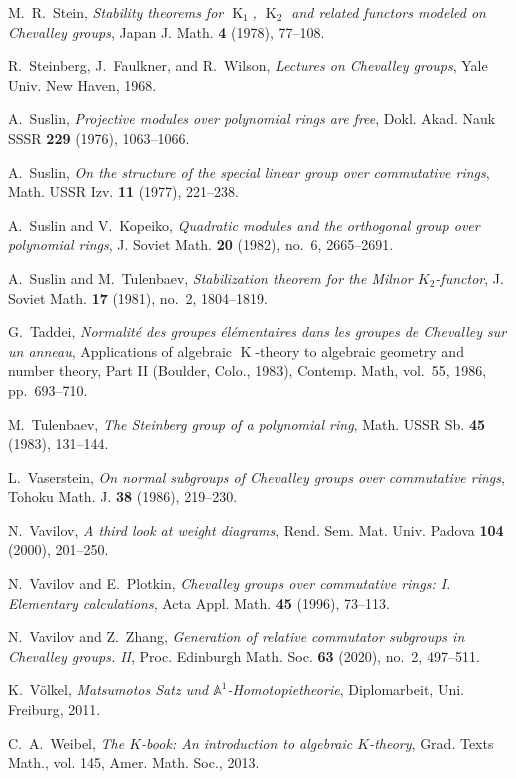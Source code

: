 \documentclass[10pt,a4paper,twoside]{article}
\theoremstyle{remark}
\theoremstyle{definition}
\numberwithin{lemma}{section}
\numberwithin{prop}{section}
\numberwithin{corollary}{section}
\numberwithin{externaltheorem}{section}
\DeclareMathOperator{\K}{K}
\numberwithin{equation}{section}
\begin{document}
\begin{thebibliography}{1000}
 M.~R.~Stein, 
 \emph{Stability theorems for $\K_1$, $\K_2$ and related functors modeled on Chevalley groups},
 Japan J. Math. \textbf{4} (1978), 77--108.

 R.~Steinberg, J.~Faulkner, and R.~Wilson, 
 \emph{Lectures on Chevalley groups},
 Yale Univ. New Haven, 1968.

 A.~Suslin, 
 \emph{Projective modules over polynomial rings are free}, 
 Dokl. Akad. Nauk SSSR \textbf{229} (1976), 1063--1066.

 A.~Suslin, 
 \emph{On the structure of the special linear group over commutative rings},
 Math. USSR Izv. \textbf{11} (1977), 221--238.

 A.~Suslin and V.~Kopeiko, 
 \emph{Quadratic modules and the orthogonal group over polynomial rings},
 J. Soviet Math. \textbf{20} (1982), no.~6, 2665--2691.

 A.~Suslin and M.~Tulenbaev, 
 \emph{Stabilization theorem for the Milnor $K_2$-functor},
 J. Soviet Math. \textbf{17} (1981), no.~2, 1804--1819.

 G.~Taddei, 
 \emph{Normalit\'e des groupes \'el\'ementaires dans les groupes de Chevalley sur un anneau},
 Applications of algebraic $\K$-theory to algebraic geometry and number theory, Part II (Boulder, Colo., 1983),
 Contemp. Math, vol.~55, 1986, pp.~693--710.

 M.~Tulenbaev, 
 \emph{The Steinberg group of a polynomial ring},
 Math. USSR Sb. \textbf{45} (1983), 131--144.

 L.~Vaserstein, 
 \emph{On normal subgroups of Chevalley groups over commutative rings},
 Tohoku Math. J. \textbf{38} (1986), 219--230.

 N.~Vavilov, 
 \emph{A third look at weight diagrams}, 
 Rend. Sem. Mat. Univ. Padova \textbf{104} (2000), 201--250.

 N.~Vavilov and E.~Plotkin, 
 \emph{Chevalley groups over commutative rings: I. Elementary calculations},
 Acta Appl. Math. \textbf{45} (1996), 73--113.

 N.~Vavilov and Z.~Zhang, 
 \emph{Generation of relative commutator subgroups in Chevalley groups. II},
 Proc. Edinburgh Math. Soc. \textbf{63} (2020), no.~2, 497--511.

 K.~V{\"o}lkel,
 \emph{Matsumotos Satz und $\mathbb{A}^1$-Homotopietheorie},
 Diplomarbeit, Uni. Freiburg, 2011.

 C.~A.~Weibel, 
 \emph{The $K$-book: An introduction to algebraic $K$-theory},
 Grad. Texts Math., vol. 145, Amer. Math. Soc., 2013.
\end{thebibliography}

\Addresses
\end{document}
